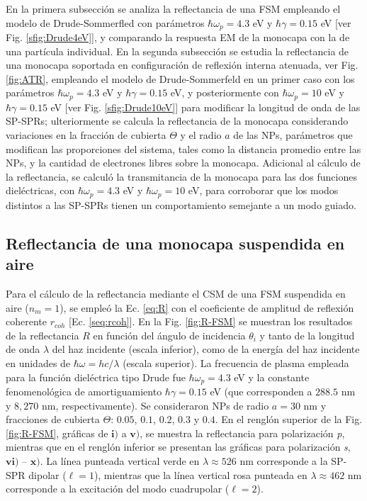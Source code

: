  En la primera subsección se analiza la reflectancia de una FSM empleando el modelo de Drude-Sommerfled con parámetros $\hbar\omega_p = 4.3$ eV y  $\hbar\gamma = 0.15$ eV [ver Fig. \ref{sfig:Drude4eV}], y comparando la respuesta EM de la monocapa con la de una partícula individual. En la segunda subsección se estudia la reflectancia de una monocapa soportada en configuración de reflexión interna atenuada, ver Fig. \ref{fig:ATR}, empleando el modelo de Drude-Sommerfeld en un primer caso con los parámetros  $\hbar\omega_p = 4.3$ eV y  $\hbar\gamma = 0.15$ eV, y posteriormente con $\hbar\omega_p = 10$ eV y $\hbar\gamma = 0.15$ eV [ver Fig. \ref{sfig:Drude10eV}] para modificar la longitud de onda de las SP-SPRs; ulteriormente se calcula la reflectancia de la monocapa considerando  variaciones en la fracción de cubierta $\Theta$ y el radio $a$ de las NPs, parámetros que modifican las proporciones del sistema, tales como la distancia promedio entre las NPs, y la cantidad de electrones libres sobre la monocapa. Adicional al cálculo de la reflectancia, se calculó la transmitancia de la monocapa para las dos funciones dieléctricas, con $\hbar\omega_p =4.3$ eV y $\hbar\omega_p =10$ eV, para corroborar que los modos distintos a las SP-SPRs tienen un comportamiento semejante a un modo guiado. 
	
	\subsection{Reflectancia de una monocapa suspendida en aire}
	\label{ssection:DrudeFSM}
	
	
Para el cálculo de la reflectancia mediante el CSM de una FSM suspendida en aire ($n_m=1$), se empleó la Ec.  \eqref{eq:R} con el coeficiente de amplitud de reflexión coherente $r_{coh}$ [Ec.  \eqref{seq:rcoh}].  En la Fig.  \ref{fig:R-FSM} se muestran los resultados de la reflectancia $R$ en función del ángulo de incidencia $\theta_i$ y tanto de la longitud de onda $\lambda$ del haz incidente (escala inferior), como de la energía del haz incidente en unidades de $\hbar\omega = h c /\lambda$ (escala superior).  La frecuencia de plasma empleada para la función dieléctrica tipo Drude fue $\hbar\omega_p = 4. 3$ eV y la constante fenomenológica de amortiguamiento $\hbar\gamma = 0. 15$ eV (que corresponden a $288. 5$ nm  y $8,270$ nm, respectivamente). Se consideraron NPs de radio $a=30$ nm y fracciones de cubierta $\Theta$: $0. 05$, $0. 1$, $0. 2$, $0. 3$ y $0. 4$. En el renglón superior de la Fig. \ref{fig:R-FSM}, gráficas de $\mathbf{i)}$ a $\mathbf{v)}$, se muestra la reflectancia para polarización \emph{p}, mientras que en el renglón inferior se presentan las gráficas para polarización \emph{s}, $\mathbf{vi)}$ -- $\mathbf{x)}$. La línea punteada vertical verde  en $\lambda \approx 526$ nm corresponde a la SP-SPR dipolar ($\ell = 1$), mientras que la línea vertical rosa punteada en $\lambda \approx 462$ nm corresponde a la excitación del modo cuadrupolar ($\ell=2$).
					
